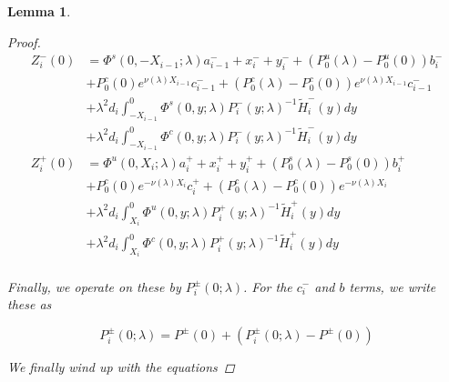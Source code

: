 \documentclass[12pt]{article}
\newtheorem{lemma}{Lemma}
\begin{document}
\begin{lemma}
\begin{proof}
\begin{align*}
Z_i^-(0) &= \Phi^s(0, -X_{i-1}; \lambda) a_{i-1}^- + x_i^- + y_i^- + (P_0^u(\lambda) - P_0^u(0))b_i^- \\
&+ P_0^c(0) e^{\nu(\lambda) X_{i-1}} c_{i-1}^- + (P_0^c(\lambda) - P_0^c(0)) e^{\nu(\lambda) X_{i-1}} c_{i-1}^- \\
&+ \lambda^2 d_i \int_{-X_{i-1}}^0 \Phi^s(0, y; \lambda) P_i^-(y; \lambda)^{-1} \tilde{H}_i^-(y) dy \\
&+ \lambda^2 d_i \int_{-X_{i-1}}^0 \Phi^c(0, y; \lambda) P_i^-(y; \lambda)^{-1} \tilde{H}_i^-(y) dy  \\ 
Z_i^+(0) &= \Phi^u(0, X_i; \lambda) a_i^+ + x_i^+ + y_i^+ + (P_0^s(\lambda) - P_0^s(0)) b_i^+ \\
&+ P_0^c(0) e^{-\nu(\lambda)X_i} c_i^+ + (P_0^c(\lambda) - P_0^c(0)) e^{-\nu(\lambda)X_i} \\
&+ \lambda^2 d_i \int_{X_i}^0 \Phi^u(0, y; \lambda) P_i^+(y; \lambda)^{-1} \tilde{H}_i^+(y) dy \\
&+ \lambda^2 d_i \int_{X_i}^0 \Phi^c(0, y; \lambda) P_i^+(y; \lambda)^{-1} \tilde{H}_i^+(y) dy \\
\end{align*}

Finally, we operate on these by $P_i^\pm(0; \lambda)$. For the $c_i^-$ and $b$ terms, we write these as

\[
P_i^\pm(0; \lambda) = P^\pm(0) + (P_i^\pm(0; \lambda) - P^\pm(0))
\]

We finally wind up with the equations


\end{proof}
\end{lemma}
\end{document}
